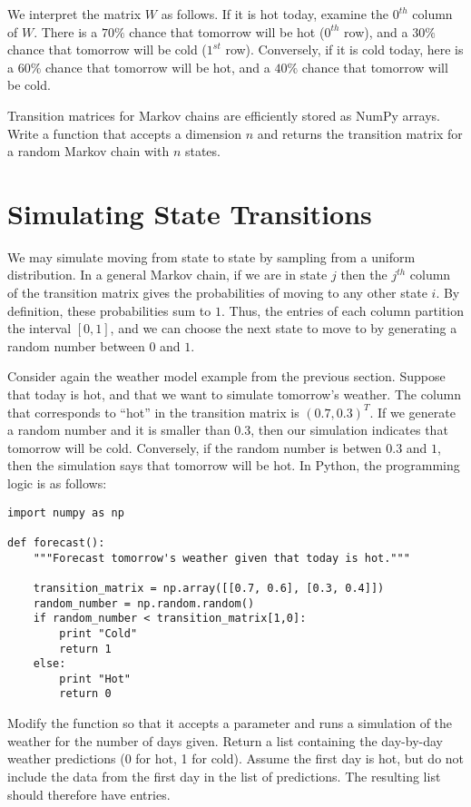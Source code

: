 We interpret the matrix $W$ as follows.
If it is hot today, examine the $0^{th}$ column of $W$.
There is a $70\%$ chance that tomorrow will be hot ($0^{th}$ row), and a $30\%$ chance that tomorrow will be cold ($1^{st}$ row).
Conversely, if it is cold today, here is a $60\%$ chance that tomorrow will be hot, and a $40\%$ chance that tomorrow will be cold.

\begin{problem}
Transition matrices for Markov chains are efficiently stored as NumPy arrays.
Write a function that accepts a dimension $n$ and returns the transition matrix for a random Markov chain with $n$ states.
\end{problem}

\section*{Simulating State Transitions}

We may simulate moving from state to state by sampling from a uniform distribution.
In a general Markov chain, if we are in state $j$ then the $j^{th}$ column of the transition matrix gives the probabilities of moving to any other state $i$.
By definition, these probabilities sum to $1$.
Thus, the entries of each column partition the interval $[0, 1]$, and we can choose the next state to move to by generating a random number between $0$ and $1$.

Consider again the weather model example from the previous section.
Suppose that today is hot, and that we want to simulate tomorrow's weather.
The column that corresponds to ``hot'' in the transition matrix is $(0.7, 0.3)^T$.
If we generate a random number and it is smaller than $0.3$, then our simulation indicates that tomorrow will be cold.
Conversely, if the random number is betwen $0.3$ and $1$, then the simulation says that tomorrow will be hot.
In Python, the programming logic is as follows:

\begin{lstlisting}
import numpy as np

def forecast():
	"""Forecast tomorrow's weather given that today is hot."""

	transition_matrix = np.array([[0.7, 0.6], [0.3, 0.4]])
	random_number = np.random.random()
	if random_number < transition_matrix[1,0]:
		print "Cold"
		return 1
	else:
		print "Hot"
		return 0
\end{lstlisting}

\begin{problem}
Modify the  function so that it accepts a parameter  and runs a simulation of the weather for the number of days given.
Return a list containing the day-by-day weather predictions (0 for hot, 1 for cold).
Assume the first day is hot, but do not include the data from the first day in the list of predictions.
The resulting list should therefore have  entries.
\end{problem}

